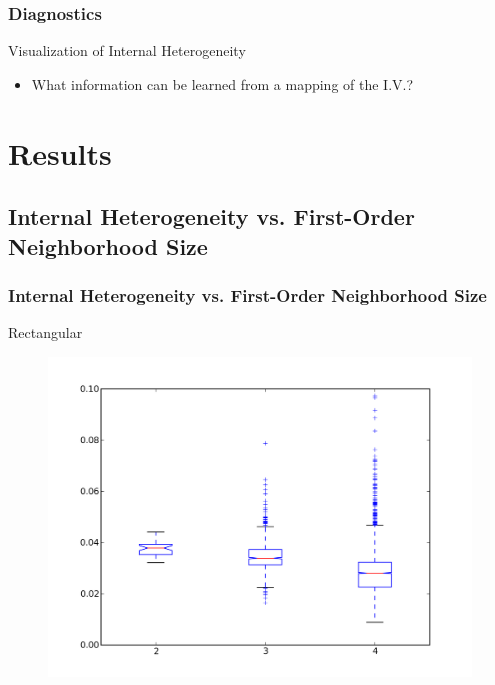 \documentclass[nototal,handout]{beamer}
\begin{document}
\begin{frame}
	\frametitle{Diagnostics}
 
\begin{block}{Visualization of Internal Heterogeneity}
 \begin{itemize}
 \item  What information can be learned from a mapping of the I.V.?
 \end{itemize}
 \end{block} \end{frame} 


\section{Results} 

\subsection{Internal Heterogeneity vs. First-Order Neighborhood Size} 

\begin{frame}
	\frametitle{Internal Heterogeneity vs. First-Order Neighborhood Size}
 
\begin{block}{Rectangular}
  \begin{center}
  \begin{figure}
  \includegraphics[width=0.75\linewidth]{rook_iv_box.png}
  \end{figure}
  \end{center}
 \end{block} \end{frame} 
\end{document}
